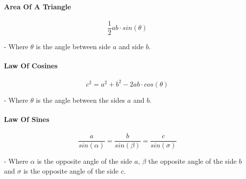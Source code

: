 \documentclass[twoside]{article}
\newcommand{\fileTitleStyle}{\large\underline}
\begin{document}
\paragraph*{Area Of A Triangle}
\vspace{1em}
\sffamily
\bgroup

$$\frac{1}{2} ab \cdot sin(\theta)$$

- Where $\theta$ is the angle between side $a$ and side $b$.
\egroup
\vspace{1em}
\begin{multicols*}{2}
\end{multicols*}
\paragraphfont{\centering\bfseries\large}
\paragraphfont{\fileTitleStyle}
\paragraph*{Law Of Cosines}
\vspace{1em}
\sffamily
\bgroup

$$c^2 = a^2 + b^2 - 2 a b \cdot cos(\theta)$$

- Where $\theta$ is the angle between the sides $a$ and $b$.

\egroup
\vspace{1em}
\begin{multicols*}{2}
\end{multicols*}
\paragraphfont{\centering\bfseries\large}
\paragraphfont{\fileTitleStyle}
\paragraph*{Law Of Sines}
\vspace{1em}
\sffamily
\bgroup

$$\frac{a}{sin(\alpha)} = \frac{b}{sin(\beta)} = \frac{c}{sin(\sigma)}$$

- Where $\alpha$ is the opposite angle of the side $a$, $\beta$ the opposite angle of the side $b$
and $\sigma$ is the opposite angle of the side $c$.
\end{document}
